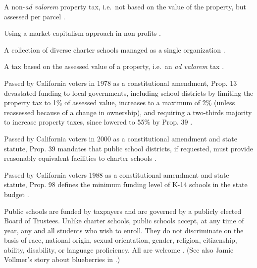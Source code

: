 \begin{description}[nosep]
  \medskip\item[parcel tax] A non-\textit{ad valorem} property tax, i.e.~not based on the value of the property, but assessed per parcel \parencite{Lu2019}.

  \medskip\item[philanthrocapitalism] Using a market capitalism approach in non-profits \parencite{Giridharadas2018}.

  \medskip\item[portfolio school district] A collection of diverse charter schools managed as a single organization \parencite{Lake.Hernandez2011}.

  \medskip\item[property tax] A tax based on the assessed value of a property, i.e.~an \textit{ad valorem} tax \parencite{BOE2018}.

  \medskip\item[Proposition 13] Passed by California voters in 1978 as a constitutional amendment, Prop. 13 devastated funding to local governments, including school districts by limiting the property tax to 1\% of assessed value, increases to a maximum of 2\% (unless reassessed because of a change in ownership), and requiring a two-thirds majority to increase property taxes, since lowered to 55\% by Prop. 39 \parencite{Aguinaldo.etal2022}.

  \medskip\item[Proposition 39] Passed by California voters in 2000 as a constitutional amendment and state statute, Prop. 39 mandates that public school districts, if requested, must provide reasonably equivalent facilities to charter schools \parencite{Aguinaldo.etal2022}.

  \medskip\item[Proposition 98] Passed by California voters 1988 as a constitutional amendment and state statute, Prop. 98 defines the minimum funding level of K-14 schools in the state budget \parencite{Aguinaldo.etal2022}.

  \medskip\item[public school] Public schools are funded by taxpayers and are governed by a publicly elected Board of Trustees. Unlike charter schools, public schools accept, at any time of year, any and all students who wish to enroll. They do not discriminate on the basis of race, national origin, sexual orientation, gender, religion, citizenship, ability, disability, or language proficiency. All are welcome \parencite{CDE2023b}. (See also Jamie Vollmer's story about blueberries in \textcite{Vollmer2011}.)


\end{description}
